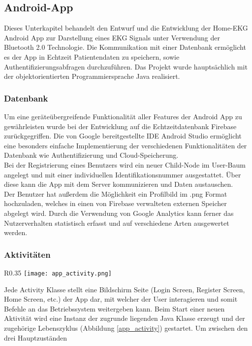 \subsection{Android-App}
Dieses Unterkapitel behandelt den Entwurf und die Entwicklung der Home-EKG Android App zur Darstellung eines EKG Signals unter Verwendung der Bluetooth 2.0 Technologie. Die Kommunikation mit einer Datenbank ermöglicht es der App in Echtzeit Patientendaten zu speichern, sowie Authentifizierungsabfragen durchzuführen. Das Projekt wurde hauptsächlich mit der objektorientierten Programmiersprache Java realisiert. 

\subsubsection{Datenbank}
Um eine geräteübergreifende Funktionalität aller Features der Android App zu gewährleisten wurde bei der Entwicklung auf die Echtzeitdatenbank Firebase zurückgegriffen. Die von Google bereitgestellte IDE Android Studio ermöglicht eine besonders einfache Implementierung der verschiedenen Funktionalitäten der Datenbank wie Authentifizierung und Cloud-Speicherung. \\
Bei der Registrierung eines Benutzers wird ein neuer Child-Node im User-Baum angelegt und mit einer individuellen Identifikationsnummer ausgestattet. Über diese kann die App mit dem Server kommunizieren und Daten austauschen. \\
Der Benutzer hat außerdem die Möglichkeit ein Profilbild im .png Format hochzuladen, welches in einen von Firebase verwalteten externen Speicher abgelegt wird. Durch die Verwendung von Google Analytics kann ferner das Nutzerverhalten statistisch erfasst und auf verschiedene Arten ausgewertet werden. 

\subsubsection{Aktivitäten}

\begin{wrapfigure}[11]{R}{0.35\textwidth}
\vspace{-25pt}
\texttt{[image: app\_activity.png]}
\caption{Lifecycle}
\label{app_activity}
\end{wrapfigure}

Jede Activity Klasse stellt eine Bildschirm Seite (Login Screen, Register Screen, Home Screen, etc.) der App dar, mit welcher der User interagieren und somit Befehle an das Betriebssystem weitergeben kann. Beim Start einer neuen Aktivität wird eine Instanz der zugrunde liegenden Java Klasse erzeugt und der zugehörige Lebenszyklus (Abbildung \ref{app_activity}) gestartet.
Um zwischen den drei Hauptzuständen

